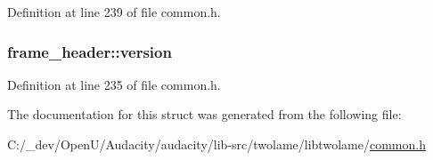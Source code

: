 Definition at line 239 of file common.\+h.

\subsubsection[{\texorpdfstring{version}{version}}]{ frame\+\_\+header\+::version}\hypertarget{structframe__header_a7c92a7131bf19d4340ffeecc3f893d09}{}\label{structframe__header_a7c92a7131bf19d4340ffeecc3f893d09}


Definition at line 235 of file common.\+h.



The documentation for this struct was generated from the following file\+:\begin{DoxyCompactItemize}
\item 
C\+:/\+\_\+dev/\+Open\+U/\+Audacity/audacity/lib-\/src/twolame/libtwolame/\hyperlink{twolame_2libtwolame_2common_8h}{common.\+h}\end{DoxyCompactItemize}
